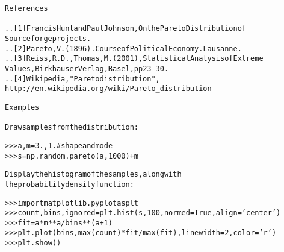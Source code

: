 \begin{boxedminipage}{\funcwidth}
\begin{alltt}
References
----------
.. [1] Francis Hunt and Paul Johnson, On the Pareto Distribution of
       Sourceforge projects.
.. [2] Pareto, V. (1896). Course of Political Economy. Lausanne.
.. [3] Reiss, R.D., Thomas, M.(2001), Statistical Analysis of Extreme
       Values, Birkhauser Verlag, Basel, pp 23-30.
.. [4] Wikipedia, "Pareto distribution",
       http://en.wikipedia.org/wiki/Pareto\_distribution

Examples
--------
Draw samples from the distribution:

{\textgreater}{\textgreater}{\textgreater} a, m = 3., 1. \# shape and mode
{\textgreater}{\textgreater}{\textgreater} s = np.random.pareto(a, 1000) + m

Display the histogram of the samples, along with
the probability density function:

{\textgreater}{\textgreater}{\textgreater} import matplotlib.pyplot as plt
{\textgreater}{\textgreater}{\textgreater} count, bins, ignored = plt.hist(s, 100, normed=True, align='center')
{\textgreater}{\textgreater}{\textgreater} fit = a*m**a/bins**(a+1)
{\textgreater}{\textgreater}{\textgreater} plt.plot(bins, max(count)*fit/max(fit),linewidth=2, color='r')
{\textgreater}{\textgreater}{\textgreater} plt.show()
\end{alltt}

\setlength{\parskip}{1ex}
    \end{boxedminipage}

    \label{QSTK:qstklearn:mldiagnostics:permutation}

    \vspace{0.5ex}

